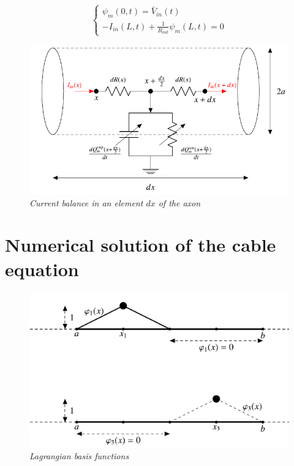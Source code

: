 \documentclass[12pt, a4paper]{report}
\begin{document}
\begin{equation}
\begin{cases}
\psi_m(0,t) = \bar{V}_{in}(t) \\
-I_{in}(L,t) +\frac{1}{R_{out}}\psi_m(L,t) =0
\end{cases}
\end{equation}

\begin{figure}[H]
	\begin{center}
		
		\includegraphics[scale=0.6]{curr_bal.png} 
	\end{center} 
	\caption{\textit{Current balance in an element $dx$ of the axon}} \label{curr_bal}
	
\end{figure}

\section{Numerical solution of the cable equation}


\begin{figure}[H]
	\begin{center}
		
		\includegraphics[scale=0.7]{basis.png} 
	\end{center} 
	\caption{\textit{Lagrangian basis functions}}
	\label{Lagrangian}
\end{figure}
\end{document}
